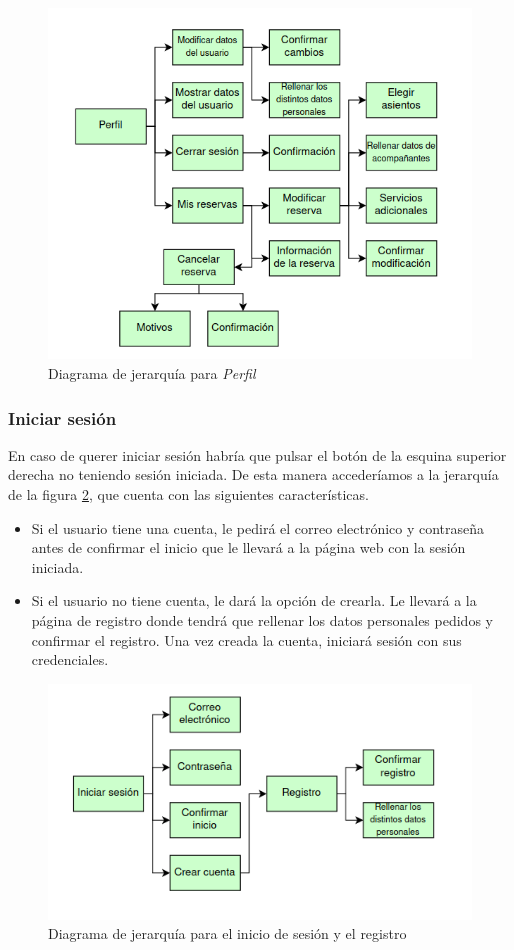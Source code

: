 \begin{figure}
      \centering
      \includegraphics[width=0.8\linewidth]{./Imagenes/jerarquia-perfil.png}
      \caption{Diagrama de jerarquía para \textit{Perfil}}
      \label{fig:jerarquias2}
\end{figure}

\subsubsection{Iniciar sesión}

En caso de querer iniciar sesión habría que pulsar el botón de la esquina superior derecha no teniendo
sesión iniciada. De esta manera accederíamos a la jerarquía de la figura \ref{fig:jerarquias3}, que
cuenta con las siguientes características.

\begin{itemize}
      \item Si el usuario tiene una cuenta, le pedirá el correo electrónico y contraseña antes
            de confirmar el inicio que le llevará a la página web con la sesión iniciada.
      \item Si el usuario no tiene cuenta, le dará la opción de crearla. Le llevará a la página
            de registro donde tendrá que rellenar los datos personales pedidos y confirmar el
            registro. Una vez creada la cuenta, iniciará sesión con sus credenciales.
\end{itemize}

\begin{figure}
      \centering
      \includegraphics[width=0.8\linewidth]{./Imagenes/jerarquia-registro.png}
      \caption{Diagrama de jerarquía para el inicio de sesión y el registro}
      \label{fig:jerarquias3}
\end{figure}

